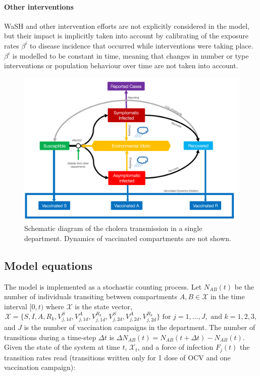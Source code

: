 \paragraph{Other interventions} WaSH and other intervention efforts are not explicitly considered in the model, but their impact is implicitly taken into account by calibrating of the exposure rates $\beta^i$ to disease incidence that occurred while interventions were taking place. $\beta^i$ is modelled to be constant in time, meaning that changes in number or type interventions or population behaviour\cite{Bertuzzo:ProbabilityExtinctionHaiti:2016} over time are not taken into account. %

\begin{figure}[htbp]
\begin{center}
\includegraphics[width=1.0\textwidth]{fig_cholera-haiti-ocv/compartiments.png}
\caption[Schematic diagram of the cholera transmission in a single department]{Schematic diagram of the cholera transmission in a single department. Dynamics of vaccinated compartments are not shown.}
\label{figEPFL}
\end{center}
\end{figure}
\subsection{Model equations}\label{sec:stoch}
The model is implemented as a stochastic counting process\cite{Breto:TimeSeriesAnalysis:2009}. Let \(N_{AB}(t)\) be the number of individuals transiting between compartments \(A,B\in \mathcal{X}\) in the time interval \([0,t)\)  where $\mathcal{X}$ is the state vector,
$$\mathcal{X} = \{S, I, A, R_k, V^S_{j,1d},V^A_{j,1d}, V^{R_k}_{j,1d}, V^S_{j,2d},V^A_{j,2d}, V^{R_k}_{j,2d}\} 
\text{ for } j = 1, ..., J, \text{ and } k = 1, 2, 3,
$$
and $J$ is the number of vaccination campaigns in the department.
The number of transitions during a time-step $\Delta t$ is
\(\Delta N_{AB}(t) = N_{AB}(t+\Delta t) - N_{AB}(t)\). Given the state of the system at time \(t\), \(\mathcal{X}_t\), and a force of infection $F_j(t)$ the transition rates read (transitions written only for 1 dose of OCV and one vaccination campaign):

